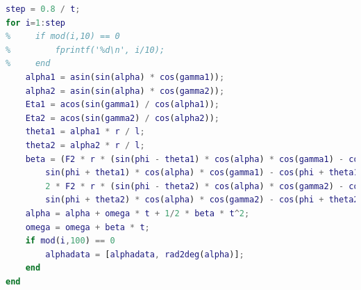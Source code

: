\documentclass{cumcm}
\begin{document}
\begin{lstlisting}[language=matlab]
% 0.2 - 1 s 恢复正常
step = 0.8 / t;
for i=1:step
%     if mod(i,10) == 0
%         fprintf('%d\n', i/10);
%     end
    alpha1 = asin(sin(alpha) * cos(gamma1));
    alpha2 = asin(sin(alpha) * cos(gamma2));
    Eta1 = acos(sin(gamma1) / cos(alpha1));
    Eta2 = acos(sin(gamma2) / cos(alpha2));
    theta1 = alpha1 * r / l;
    theta2 = alpha2 * r / l;
    beta = (F2 * r * (sin(phi - theta1) * cos(alpha) * cos(gamma1) - cos(phi - theta1) * sin(alpha1) * sin(Eta1) - ...
        sin(phi + theta1) * cos(alpha) * cos(gamma1) - cos(phi + theta1) * sin(alpha1) * sin(Eta1)) + ...
        2 * F2 * r * (sin(phi - theta2) * cos(alpha) * cos(gamma2) - cos(phi - theta2) * sin(alpha2) * sin(Eta2) - ...
        sin(phi + theta2) * cos(alpha) * cos(gamma2) - cos(phi + theta2) * sin(alpha2) * sin(Eta2))) / J;
    alpha = alpha + omega * t + 1/2 * beta * t^2;
    omega = omega + beta * t;
    if mod(i,100) == 0
        alphadata = [alphadata, rad2deg(alpha)];
    end
end
\end{lstlisting}
\end{document}
